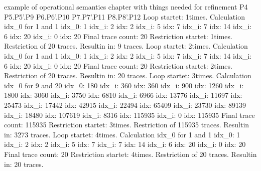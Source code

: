 \begin{old}{example of operational semantics chapter with things needed for refinement}
P4
P5.P5'.P9
P6.P6'.P10
P7.P7'.P11
P8.P8'.P12
Loop startet: 1times.
Calculation idx_0 for 1 and 1
idx_0: 1
idx_i: 2
idx: 2
idx_i: 5
idx: 7
idx_i: 7
idx: 14
idx_i: 6
idx: 20
idx_i: 0
idx: 20
Final trace count: 20
Restriction startet: 1times.
Restriction of 20 traces.
Resultin in: 9 traces.
Loop startet: 2times.
Calculation idx_0 for 1 and 1
idx_0: 1
idx_i: 2
idx: 2
idx_i: 5
idx: 7
idx_i: 7
idx: 14
idx_i: 6
idx: 20
idx_i: 0
idx: 20
Final trace count: 20
Restriction startet: 2times.
Restriction of 20 traces.
Resultin in: 20 traces.
Loop startet: 3times.
Calculation idx_0 for 9 and 20
idx_0: 180
idx_i: 360
idx: 360
idx_i: 900
idx: 1260
idx_i: 1800
idx: 3060
idx_i: 3750
idx: 6810
idx_i: 6966
idx: 13776
idx_i: 11697
idx: 25473
idx_i: 17442
idx: 42915
idx_i: 22494
idx: 65409
idx_i: 23730
idx: 89139
idx_i: 18480
idx: 107619
idx_i: 8316
idx: 115935
idx_i: 0
idx: 115935
Final trace count: 115935
Restriction startet: 3times.
Restriction of 115935 traces.
Resultin in: 3273 traces.
Loop startet: 4times.
Calculation idx_0 for 1 and 1
idx_0: 1
idx_i: 2
idx: 2
idx_i: 5
idx: 7
idx_i: 7
idx: 14
idx_i: 6
idx: 20
idx_i: 0
idx: 20
Final trace count: 20
Restriction startet: 4times.
Restriction of 20 traces.
Resultin in: 20 traces.

\end{old}
